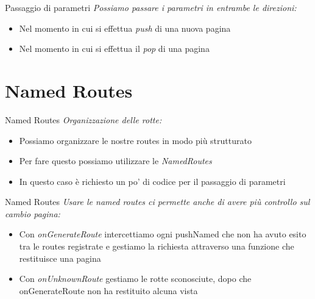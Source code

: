 \documentclass{../libs/presentation_format}
\begin{document}

\begin{frame}{Passaggio di parametri}
	\emph{Possiamo passare i parametri in entrambe le direzioni:}
	\begin{itemize}
		\item Nel momento in cui si effettua \emph{push} di una nuova pagina
		\item Nel momento in cui si effettua il \emph{pop} di una pagina
	\end{itemize}
	\centering
	\href{https://docs.flutter.dev/cookbook/navigation/returning-data}{}
\end{frame}


\section{Named Routes}
\begin{frame}{Named Routes}
	\emph{Organizzazione delle rotte:}
	\begin{itemize}
		\item Possiamo organizzare le nostre routes in modo più strutturato
		\item Per fare questo possiamo utilizzare le \emph{NamedRoutes}
		\item In questo caso è richiesto un po' di codice per il passaggio di parametri
	\end{itemize}
	\centering
	\href{https://docs.flutter.dev/cookbook/navigation/named-routes}{}
\end{frame}


\begin{frame}{Named Routes}
	\emph{Usare le named routes ci permette anche di avere più controllo sul cambio pagina:}
	\begin{itemize}
		\item Con \emph{onGenerateRoute} intercettiamo ogni pushNamed che non ha avuto esito tra le routes registrate e gestiamo la richiesta attraverso una funzione che restituisce una pagina
		\item Con \emph{onUnknownRoute} gestiamo le rotte sconosciute, dopo che onGenerateRoute non ha restituito alcuna vista
	\end{itemize}
	\centering
	\href{https://medium.com/flutter-community/flutter-navigation-cheatsheet-a-guide-to-named-routing-dc642702b98cs}{}
\end{frame}
\end{document}
